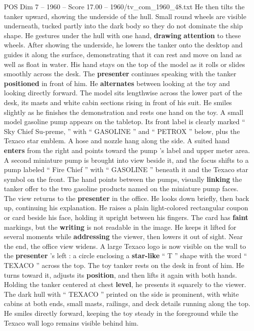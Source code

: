 \begin{textsample}{POS Dim 7 – 1960 – Score 17.00 – 1960/tv\_com\_1960\_48.txt}
He then tilts the tanker upward, showing the underside of the hull.
Small round wheels are visible underneath, tucked partly into the dark body so they do not dominate the ship shape.
He gestures under the hull with one hand, \textbf{drawing} \textbf{attention} to these wheels.
After showing the underside, he lowers the tanker onto the desktop and guides it along the surface, demonstrating that it can rest and move on land as well as float in water.
His hand stays on the top of the model as it rolls or slides smoothly across the desk.
The \textbf{presenter} continues speaking with the tanker \textbf{positioned} in front of him.
He \textbf{alternates} between looking at the toy and looking directly forward.
The model sits lengthwise across the lower part of the desk, its masts and white cabin sections rising in front of his suit.
He smiles slightly as he finishes the demonstration and rests one hand on the toy.
A small model gasoline pump appears on the tabletop.
Its front label is clearly marked “ Sky Chief Su-preme, ” with “ GASOLINE ” and “ PETROX ” below, plus the Texaco star emblem.
A hose and nozzle hang along the side.
A suited hand \textbf{enters} from the right and points toward the pump ’s label and upper meter area.
A second miniature pump is brought into view beside it, and the focus shifts to a pump labeled “ Fire Chief ” with “ GASOLINE ” beneath it and the Texaco star symbol on the front.
The hand points between the pumps, visually \textbf{linking} the tanker offer to the two gasoline products named on the miniature pump faces.
The view returns to the \textbf{presenter} in the office.
He looks down briefly, then back up, continuing his explanation.
He raises a plain light-colored rectangular coupon or card beside his face, holding it upright between his fingers.
The card has \textbf{faint} markings, but the \textbf{writing} is not readable in the image.
He keeps it lifted for several moments while \textbf{addressing} the viewer, then lowers it out of sight.
Near the end, the office view widens.
A large Texaco logo is now visible on the wall to the \textbf{presenter} ’s left : a circle enclosing a \textbf{star-like} “ T ” shape with the word “ TEXACO ” across the top.
The toy tanker rests on the desk in front of him.
He turns toward it, adjusts its \textbf{position}, and then lifts it again with both hands.
Holding the tanker centered at chest \textbf{level}, he presents it squarely to the viewer.
The dark hull with “ TEXACO ” printed on the side is prominent, with white cabins at both ends, small masts, railings, and deck details running along the top.
He smiles directly forward, keeping the toy steady in the foreground while the Texaco wall logo remains visible behind him.

\end{textsample}
